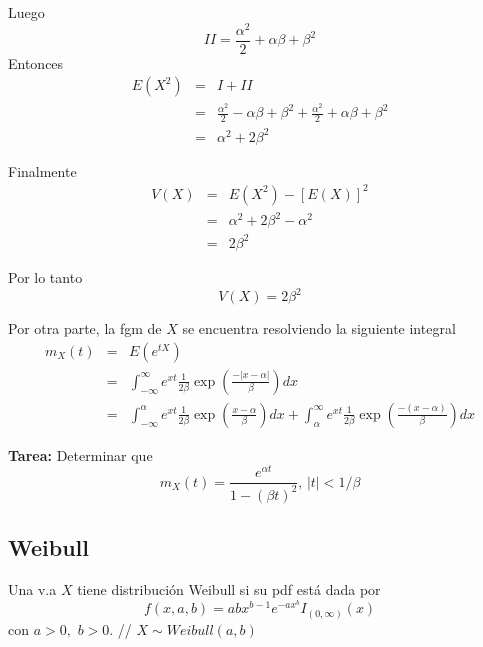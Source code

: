 \begin{i}
Luego
\begin{equation*}
II=\frac{\alpha ^{2}}{2}+\alpha \beta +\beta ^{2}
\end{equation*}%
Entonces 
\begin{eqnarray*}
E(X^{2}) &=&I+II \\
&=&\frac{\alpha ^{2}}{2}-\alpha \beta +\beta ^{2}+\frac{\alpha ^{2}}{2}%
+\alpha \beta +\beta ^{2} \\
&=&\alpha ^{2}+2\beta ^{2}
\end{eqnarray*}

Finalmente
\begin{eqnarray*}
V(X) &=&E(X^{2})-[E(X)]^{2} \\
&=&\alpha ^{2}+2\beta ^{2}-\alpha ^{2} \\
&=&2\beta ^{2}
\end{eqnarray*}

Por lo tanto 
\begin{equation*}
V(X)=2\beta ^{2}
\end{equation*}

Por otra parte, la fgm de $X$ se encuentra resolviendo la siguiente integral
\begin{eqnarray*}
m_{X}(t) &=&E(e^{tX}) \\
&=&\int_{-\infty }^{\infty }e^{xt}\frac{1}{2\beta }\exp \left( \frac{
-\left\vert x-\alpha \right\vert }{\beta }\right) dx \\
&=&\int_{-\infty }^{\alpha }e^{xt}\frac{1}{2\beta }\exp \left( \frac{
x-\alpha }{\beta }\right) dx+\int_{\alpha }^{\infty }e^{xt}\frac{1}{2\beta }
\exp \left( \frac{-(x-\alpha )}{\beta }\right) dx
\end{eqnarray*}

\textbf{Tarea: }Determinar que 
\begin{equation*}
m_{X}(t)=\frac{e^{\alpha t}}{1-(\beta t)^{2}}\text{, \ \ \ }\left\vert
t\right\vert <1/\beta
\end{equation*}

\subsection{Weibull}

\begin{definition}
Una v.a $X$ tiene distribución Weibull si su pdf está dada por
\begin{equation*}
f(x,a,b)=abx^{b-1}e^{-ax^{b}}I_{(0,\infty )}(x)
\end{equation*}%
con $a>0,$ $b>0$. // $X\sim Weibull(a,b)$
\end{definition}


\end{i}
